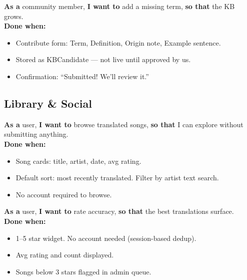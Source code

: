 \documentclass[12pt, a4paper]{article}
\begin{document}
\begin{tcolorbox}[storybox, title={US-13 — Submit a Missing Definition}]
  \textbf{As a} community member, \textbf{I want to} add a missing term,
  \textbf{so that} the KB grows.\\[0.4em]
  \textbf{Done when:}
  \begin{itemize}
    \item Contribute form: Term, Definition, Origin note, Example sentence.
    \item Stored as KBCandidate — not live until approved by us.
    \item Confirmation: ``Submitted! We'll review it.''
  \end{itemize}
\end{tcolorbox}

\subsection{Library \& Social}

\begin{tcolorbox}[storybox, title={US-14 — Browse Song Library}]
  \textbf{As a} user, \textbf{I want to} browse translated songs,
  \textbf{so that} I can explore without submitting anything.\\[0.4em]
  \textbf{Done when:}
  \begin{itemize}
    \item Song cards: title, artist, date, avg rating.
    \item Default sort: most recently translated. Filter by artist text search.
    \item No account required to browse.
  \end{itemize}
\end{tcolorbox}

\begin{tcolorbox}[storybox, title={US-15 — Rate a Translation}]
  \textbf{As a} user, \textbf{I want to} rate accuracy,
  \textbf{so that} the best translations surface.\\[0.4em]
  \textbf{Done when:}
  \begin{itemize}
    \item 1--5 star widget. No account needed (session-based dedup).
    \item Avg rating and count displayed.
    \item Songs below 3 stars flagged in admin queue.
  \end{itemize}
\end{tcolorbox}
\end{document}
